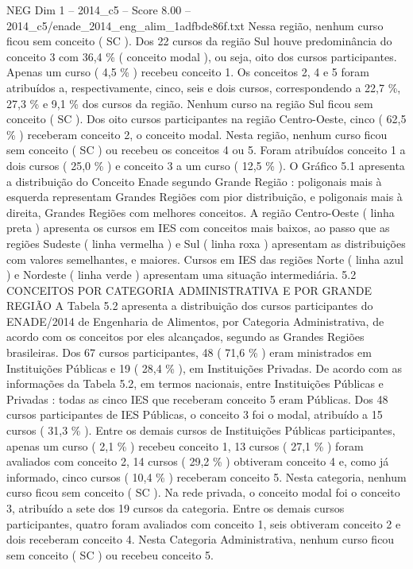 \begin{textsample}{NEG Dim 1 – 2014\_c5 – Score 8.00 – 2014\_c5/enade\_2014\_eng\_alim\_1adfbde86f.txt}
Nessa região, nenhum curso ficou sem conceito ( SC ).
Dos 22 cursos da região Sul houve predominância do conceito 3 com 36,4 \% ( conceito modal ), ou seja, oito dos cursos participantes.
Apenas um curso ( 4,5 \% ) recebeu conceito 1.
Os conceitos 2, 4 e 5 foram atribuídos a, respectivamente, cinco, seis e dois cursos, correspondendo a 22,7 \%, 27,3 \% e 9,1 \% dos cursos da região.
Nenhum curso na região Sul ficou sem conceito ( SC ).
Dos oito cursos participantes na região Centro-Oeste, cinco ( 62,5 \% ) receberam conceito 2, o conceito modal.
Nesta região, nenhum curso ficou sem conceito ( SC ) ou recebeu os conceitos 4 ou 5.
Foram atribuídos conceito 1 a dois cursos ( 25,0 \% ) e conceito 3 a um curso ( 12,5 \% ).
O Gráfico 5.1 apresenta a distribuição do Conceito Enade segundo Grande Região : poligonais mais à esquerda representam Grandes Regiões com pior distribuição, e poligonais mais à direita, Grandes Regiões com melhores conceitos.
A região Centro-Oeste ( linha preta ) apresenta os cursos em IES com conceitos mais baixos, ao passo que as regiões Sudeste ( linha vermelha ) e Sul ( linha roxa ) apresentam as distribuições com valores semelhantes, e maiores.
Cursos em IES das regiões Norte ( linha azul ) e Nordeste ( linha verde ) apresentam uma situação intermediária. 5.2 CONCEITOS POR CATEGORIA ADMINISTRATIVA E POR GRANDE REGIÃO A Tabela 5.2 apresenta a distribuição dos cursos participantes do ENADE/2014 de Engenharia de Alimentos, por Categoria Administrativa, de acordo com os conceitos por eles alcançados, segundo as Grandes Regiões brasileiras.
Dos 67 cursos participantes, 48 ( 71,6 \% ) eram ministrados em Instituições Públicas e 19 ( 28,4 \% ), em Instituições Privadas.
De acordo com as informações da Tabela 5.2, em termos nacionais, entre Instituições Públicas e Privadas : todas as cinco IES que receberam conceito 5 eram Públicas.
Dos 48 cursos participantes de IES Públicas, o conceito 3 foi o modal, atribuído a 15 cursos ( 31,3 \% ).
Entre os demais cursos de Instituições Públicas participantes, apenas um curso ( 2,1 \% ) recebeu conceito 1, 13 cursos ( 27,1 \% ) foram avaliados com conceito 2, 14 cursos ( 29,2 \% ) obtiveram conceito 4 e, como já informado, cinco cursos ( 10,4 \% ) receberam conceito 5.
Nesta categoria, nenhum curso ficou sem conceito ( SC ).
Na rede privada, o conceito modal foi o conceito 3, atribuído a sete dos 19 cursos da categoria.
Entre os demais cursos participantes, quatro foram avaliados com conceito 1, seis obtiveram conceito 2 e dois receberam conceito 4.
Nesta Categoria Administrativa, nenhum curso ficou sem conceito ( SC ) ou recebeu conceito 5.

\end{textsample}
